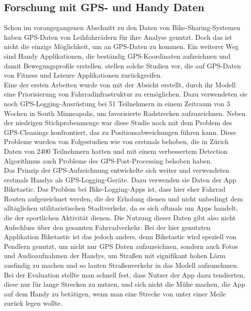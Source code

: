 \documentclass[a4paper,12pt]{thesis}
\begin{document}
\subsection{Forschung mit GPS- und Handy Daten}\label{chpt:gps}


Schon im vorangegangenen Abschnitt zu den Daten von Bike-Sharing-Systemen haben \cite{Li2022} GPS-Daten von Leihfahrrädern für ihre Analyse genutzt. Doch das ist nicht die einzige Möglichkeit, um an GPS-Daten zu kommen. Ein weiterer Weg sind Handy Applikationen, die beständig GPS-Koordinaten aufzeichnen und damit Bewegungsprofile erstellen. \cite{Romanillos2016} stellen solche Studien vor, die auf GPS-Daten von Fitness und Leisure Applikationen zurückgreifen.\\ 
Eine der ersten Arbeiten wurde von \cite{Harvey2007} mit der Absicht erstellt, durch ihr Modell eine Priorisierung von Fahrradinfrastruktur zu ermöglichen. Dazu verwendeten sie noch GPS-Logging-Ausrüstung bei 51 Teilnehmern in einem Zeitraum von 3 Wochen in South Minneapolis, um favorisierte Radstrecken aufzuzeichnen. Neben der niedrigen Stichprobenmenge war diese Studie noch mit dem Problem des GPS-Cleanings konfrontiert, das zu Positionsabweichungen führen kann. Diese Probleme wurden von Folgestudien wie von \cite{Menghini2010} erstmals behoben, die in Zürich Daten von 2400 Teilnehmern hatten und mit einem verbessertem Detection Algorithmus auch Probleme des GPS-Post-Processing behoben haben.\\ 
Das Prinzip der GPS-Aufzeichnung entwickelte sich weiter und \cite{Reddy2010} verwendeten erstmals Handys als GPS-Logging-Geräte. Dazu verwenden sie Daten der App Biketastic. Das Problem bei Bike-Logging-Apps ist, dass hier eher Fahrrad Routen aufgezeichnet werden, die der Erholung dienen und nicht unbedingt dem alltäglichen utilitaristischen Stadtverkehr, da es sich oftmals um Apps handelt, die der sportlichen Aktivität dienen. Die Nutzung dieser Daten gibt also nicht Aufschluss über den gesamten Fahrradverkehr. Bei der hier genutzten Applikation Biketastic ist das jedoch anders, denn Biketastic wird speziell von Pendlern genutzt, um nicht nur GPS Daten aufzuzeichnen, sondern auch Fotos und Audioaufnahmen der Handys, um Straßen mit signifikant hohen Lärm ausfindig zu machen und so lauten Straßenverkehr in das Modell aufzunehmen. Bei der Evaluation stellte man schnell fest, dass Nutzer der App dazu tendierten, diese nur für lange Strecken zu nutzen, und sich nicht die Mühe machen, die App auf dem Handy zu betätigen, wenn man eine Strecke von unter einer Meile zurück legen wollte.\\
\end{document}
